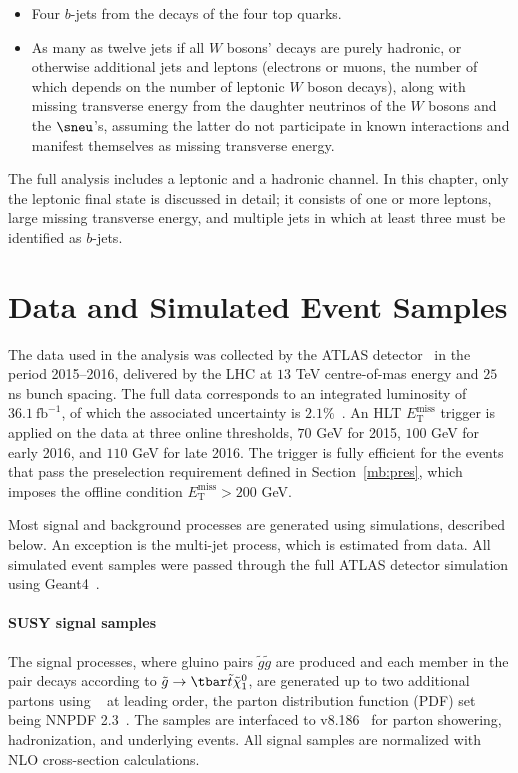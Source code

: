 \begin{itemize}

	\item Four $b$-jets from the decays of the four top quarks.

\item As many as twelve jets if all $W$ bosons' decays are purely hadronic, or
otherwise additional jets and leptons (electrons or muons, the number of which
depends on the number of leptonic $W$ boson decays), along with missing
transverse energy from the daughter neutrinos of the $W$ bosons and the
$\sneu$'s, assuming the latter do not participate in known interactions and
manifest themselves as missing transverse energy.

\end{itemize}

The full analysis includes a leptonic and a hadronic channel. In this chapter,
only the leptonic final state is discussed in detail; it consists of one or
more leptons, large missing transverse energy, and multiple jets in which at
least three must be identified as $b$-jets.

\section{Data and Simulated Event Samples}\label{mbdatasm}

The data used in the analysis was collected by the ATLAS
detector~\cite{PERF-2007-01} in the period 2015--2016, delivered by the LHC at
$13$ TeV centre-of-mas energy and $25$ ns bunch spacing. The full data
corresponds to an integrated luminosity of $36.1~\text{fb}^{-1}$, of which the
associated uncertainty is $2.1\%$~\cite{DAPR-2013-01}. An HLT
$E_{\text{T}}^{\text{miss}}$ trigger is applied on the data at three online
thresholds, $70$ GeV for 2015, $100$ GeV for early 2016, and $110$ GeV for late
2016. The trigger is fully efficient for the events that pass the preselection
requirement defined in Section~\ref{mb:pres}, which imposes the offline
condition $E_{\text{T}}^{\text{miss}} > 200$ GeV.

Most signal and background processes are generated using simulations, described
below. An exception is the multi-jet process, which is estimated from data. All
simulated event samples were passed through the full ATLAS detector simulation
using Geant4~\cite{Agostinelli:2002hh}.

\paragraph{SUSY signal samples} The signal processes, where gluino pairs
$\tilde{g}\tilde{g}$ are produced and each member in the pair decays according
to $\tilde{g}\to \tbar\tilde{t}\tilde{\chi}^0_1$, are generated up to two
additional partons using \MGMCatNLO~\cite{Alwall:2014hca} at leading order, the
parton distribution function (PDF) set being NNPDF 2.3~\cite{Ball:2012cx}. The
samples are interfaced to \PYTHIA v8.186~\cite{Sjostrand:2007gs} for parton
showering, hadronization, and underlying events. All signal samples are
normalized with NLO cross-section calculations.



